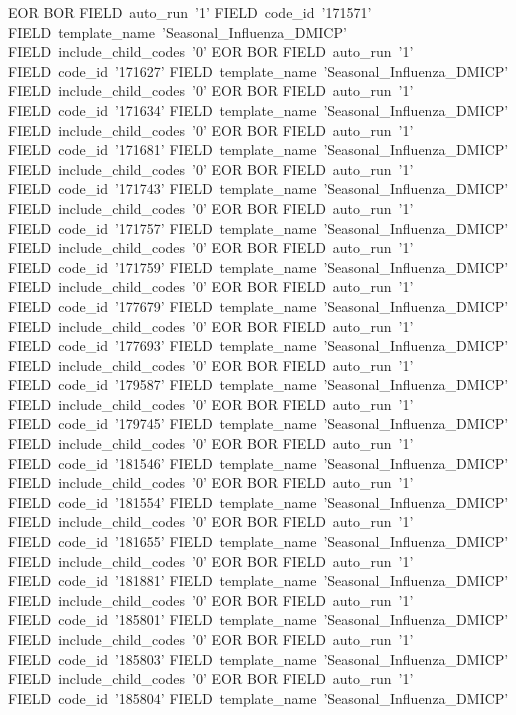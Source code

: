   EOR
  BOR
    FIELD~auto_run~'1'
    FIELD~code_id~'171571'
    FIELD~template_name~'Seasonal_Influenza_DMICP'
    FIELD~include_child_codes~'0'
  EOR
  BOR
    FIELD~auto_run~'1'
    FIELD~code_id~'171627'
    FIELD~template_name~'Seasonal_Influenza_DMICP'
    FIELD~include_child_codes~'0'
  EOR
  BOR
    FIELD~auto_run~'1'
    FIELD~code_id~'171634'
    FIELD~template_name~'Seasonal_Influenza_DMICP'
    FIELD~include_child_codes~'0'
  EOR
  BOR
    FIELD~auto_run~'1'
    FIELD~code_id~'171681'
    FIELD~template_name~'Seasonal_Influenza_DMICP'
    FIELD~include_child_codes~'0'
  EOR
  BOR
    FIELD~auto_run~'1'
    FIELD~code_id~'171743'
    FIELD~template_name~'Seasonal_Influenza_DMICP'
    FIELD~include_child_codes~'0'
  EOR
  BOR
    FIELD~auto_run~'1'
    FIELD~code_id~'171757'
    FIELD~template_name~'Seasonal_Influenza_DMICP'
    FIELD~include_child_codes~'0'
  EOR
  BOR
    FIELD~auto_run~'1'
    FIELD~code_id~'171759'
    FIELD~template_name~'Seasonal_Influenza_DMICP'
    FIELD~include_child_codes~'0'
  EOR
  BOR
    FIELD~auto_run~'1'
    FIELD~code_id~'177679'
    FIELD~template_name~'Seasonal_Influenza_DMICP'
    FIELD~include_child_codes~'0'
  EOR
  BOR
    FIELD~auto_run~'1'
    FIELD~code_id~'177693'
    FIELD~template_name~'Seasonal_Influenza_DMICP'
    FIELD~include_child_codes~'0'
  EOR
  BOR
    FIELD~auto_run~'1'
    FIELD~code_id~'179587'
    FIELD~template_name~'Seasonal_Influenza_DMICP'
    FIELD~include_child_codes~'0'
  EOR
  BOR
    FIELD~auto_run~'1'
    FIELD~code_id~'179745'
    FIELD~template_name~'Seasonal_Influenza_DMICP'
    FIELD~include_child_codes~'0'
  EOR
  BOR
    FIELD~auto_run~'1'
    FIELD~code_id~'181546'
    FIELD~template_name~'Seasonal_Influenza_DMICP'
    FIELD~include_child_codes~'0'
  EOR
  BOR
    FIELD~auto_run~'1'
    FIELD~code_id~'181554'
    FIELD~template_name~'Seasonal_Influenza_DMICP'
    FIELD~include_child_codes~'0'
  EOR
  BOR
    FIELD~auto_run~'1'
    FIELD~code_id~'181655'
    FIELD~template_name~'Seasonal_Influenza_DMICP'
    FIELD~include_child_codes~'0'
  EOR
  BOR
    FIELD~auto_run~'1'
    FIELD~code_id~'181881'
    FIELD~template_name~'Seasonal_Influenza_DMICP'
    FIELD~include_child_codes~'0'
  EOR
  BOR
    FIELD~auto_run~'1'
    FIELD~code_id~'185801'
    FIELD~template_name~'Seasonal_Influenza_DMICP'
    FIELD~include_child_codes~'0'
  EOR
  BOR
    FIELD~auto_run~'1'
    FIELD~code_id~'185803'
    FIELD~template_name~'Seasonal_Influenza_DMICP'
    FIELD~include_child_codes~'0'
  EOR
  BOR
    FIELD~auto_run~'1'
    FIELD~code_id~'185804'
    FIELD~template_name~'Seasonal_Influenza_DMICP'
